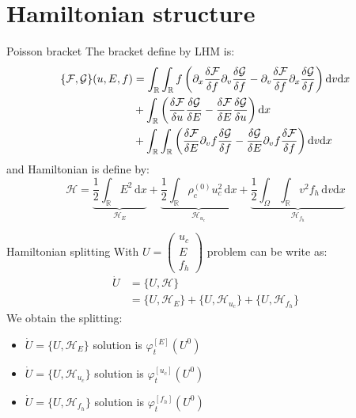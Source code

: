 \documentclass{beamer}
\newcommand{\arrow}{{\color{PLB}\ding{220}}}
\begin{document}
\section{Hamiltonian structure}
\begin{frame}{Poisson bracket}
  The bracket define by LHM is:
  $$
    \begin{aligned}
      \{ {\cal F}, {\cal G} \}( u, E, f) &= \int_{\mathbb{R}}\int_{\mathbb{R}} f \left( \partial_x \frac{\delta {\cal F}}{\delta f}\partial_{v} \frac{\delta {\cal G}}{\delta f} - \partial_{v} \frac{\delta {\cal F}}{\delta f}\partial_{x} \frac{\delta {\cal G}}{\delta f}\right)\mathrm{d}v \mathrm{d}x \\
                           & + \int_{\mathbb{R}}  \left(  \frac{\delta {\cal F}}{\delta{ u}}  \frac{\delta {\cal G}}{\delta{ E}} - \frac{\delta {\cal F}}{\delta{ E}}  \frac{\delta {\cal G}}{\delta{u}} \right) \mathrm{d}x \\
                           & + \int_{\mathbb{R}}\int_{\mathbb{R}}  \left(  \frac{\delta {\cal F}}{\delta{ E}}  \partial_v f\frac{\delta {\cal G}}{\delta{ f}} - \frac{\delta {\cal G}}{\delta{ E}} \partial_v f \frac{\delta {\cal F}}{\delta{f}} \right) \mathrm{d}{ v}\mathrm{d}x \\
    \end{aligned}
  $$
  and Hamiltonian is define by:
  $$
    \mathcal{H} = \underbrace{\frac{1}{2}\int_\mathbb{R}E^2\,\mathrm{d}x}_{\mathcal{H}_{E}}
                + \underbrace{\frac{1}{2}\int_\mathbb{R}\rho_c^{(0)}u_c^2\,\mathrm{d}x}_{\mathcal{H}_{u_c}}
                + \underbrace{\frac{1}{2}\int_\Omega\int_\mathbb{R}v^2f_h\,\mathrm{d}v\mathrm{d}x}_{\mathcal{H}_{f_h}}
  $$
\end{frame}
\begin{frame}{Hamiltonian splitting}
  With $U=\begin{pmatrix}u_c\\E\\f_h\end{pmatrix}$ problem can be write as:
  $$
    \begin{aligned}
      \dot{U} &= \{U,\mathcal{H}\} \\
              &= \{U,\mathcal{H}_{E}\} + \{U,\mathcal{H}_{u_c}\} + \{U,\mathcal{H}_{f_h}\}
    \end{aligned}
  $$
  We obtain the splitting:
  \begin{itemize}
    \item $\dot{U} = \{U,\mathcal{H}_{E}\}$   \hfill \arrow \hfill solution is $\varphi^{[E]}_t(U^0)$
    \item $\dot{U} = \{U,\mathcal{H}_{u_c}\}$ \hfill \arrow \hfill solution is $\varphi^{[u_c]}_t(U^0)$
    \item $\dot{U} = \{U,\mathcal{H}_{f_h}\}$ \hfill \arrow \hfill solution is $\varphi^{[f_h]}_t(U^0)$
  \end{itemize}
\end{frame}
\end{document}
